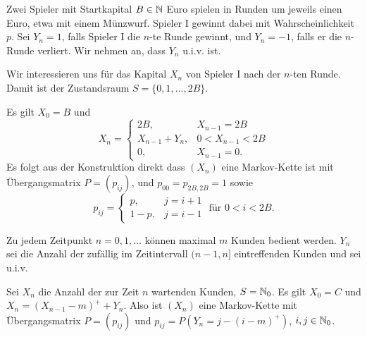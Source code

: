 \documentclass[a4paper,twoside,DIV15,BCOR12mm]{scrbook}
\begin{document}
\begin{beispiel}[Ruinspiel]
Zwei Spieler mit Startkapital $B\in\mathbb{N}$ Euro spielen in Runden um jeweils einen Euro, etwa mit einem Münzwurf. Spieler I gewinnt dabei mit Wahrscheinlichkeit $p$. Sei $Y_n = 1$, falls Spieler I die $n$-te Runde gewinnt, und $Y_n= -1$, falls er die $n$-Runde verliert. Wir nehmen an, dass $Y_n$ u.i.v. ist.

Wir interessieren uns für das Kapital $X_n$ von Spieler I nach der $n$-ten Runde. Damit ist der Zustandsraum $S=\{0,1,\ldots,2B\}$.

Es gilt $X_0 = B$ und
\[
X_n = 
\begin{cases}
2B, &X_{n-1} = 2B \\
X_{n-1} + Y_n, & 0 < X_{n-1} < 2B \\
0, &X_{n-1} = 0.
\end{cases}
\]
Es folgt aus der Konstruktion direkt dass $(X_n)$ eine Markov-Kette ist mit Übergangsmatrix $P=(p_{ij})$, und
$p_{00} = p_{2B,2B} = 1$ sowie
\[
p_{ij} = 
\begin{cases}
p, &j=i+1\\
1-p, &j=i-1 
\end{cases}\text{ für } 0<i<2B.
\]
\begin{center}
\end{center}
\end{beispiel}

\begin{beispiel}[Wartesystem]
Zu jedem Zeitpunkt $n=0,1,\ldots$ können maximal $m$ Kunden bedient werden. $Y_n$ sei die Anzahl der zufällig im Zeitintervall $(n-1,n]$ eintreffenden Kunden und sei u.i.v.

Sei $X_n$ die Anzahl der zur Zeit $n$ wartenden Kunden, $S=\mathbb{N}_0$. Es gilt $X_0 = C$ und $X_n = (X_{n-1}-m)^+ + Y_n$. Also ist $(X_n)$ eine Markov-Kette mit Übergangsmatrix $P=(p_{ij})$ und $p_{ij} = P(Y_n = j-(i-m)^+)$, $i,j\in \mathbb{N}_0$.
\end{beispiel}
\end{document}

